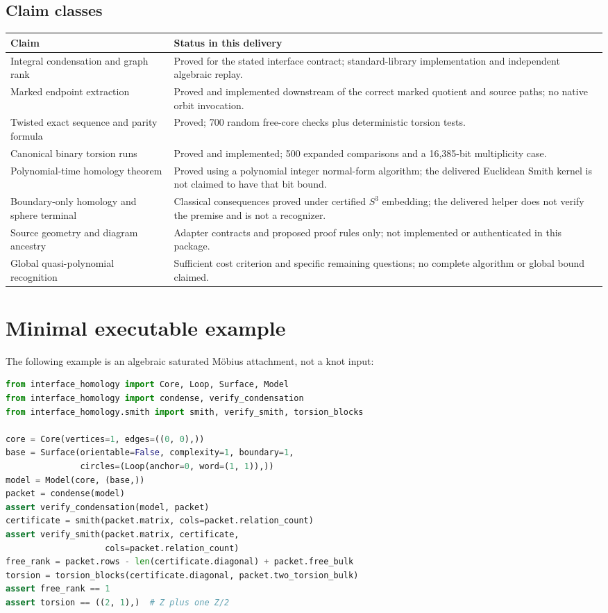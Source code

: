 \documentclass[11pt]{article}
\theoremstyle{definition}
\theoremstyle{remark}
\begin{document}
\subsection{Claim classes}
\begin{longtable}{@{}>{\raggedright\arraybackslash}p{}>{\raggedright\arraybackslash}p{}@{}}
\toprule
Claim & Status in this delivery\\
\midrule
\endhead
Integral condensation and graph rank & Proved for the stated interface
contract; standard-library implementation and independent algebraic replay.\\
Marked endpoint extraction & Proved and implemented downstream of the
correct marked quotient and source paths; no native orbit invocation.\\
Twisted exact sequence and parity formula & Proved; 700 random free-core
checks plus deterministic torsion tests.\\
Canonical binary torsion runs & Proved and implemented; 500 expanded
comparisons and a 16,385-bit multiplicity case.\\
Polynomial-time homology theorem & Proved using a polynomial integer
normal-form algorithm; the delivered Euclidean Smith kernel is not claimed
to have that bit bound.\\
Boundary-only homology and sphere terminal & Classical consequences proved
under certified $S^3$ embedding; the delivered helper does not verify the
premise and is not a recognizer.\\
Source geometry and diagram ancestry & Adapter contracts and proposed proof
rules only; not implemented or authenticated in this package.\\
Global quasi-polynomial recognition & Sufficient cost criterion and specific
remaining questions; no complete algorithm or global bound claimed.\\
\bottomrule
\end{longtable}

\section{Minimal executable example}
\label{app:example}
The following example is an algebraic saturated M\"obius attachment, not a
knot input:
\begin{lstlisting}[language=Python]
from interface_homology import Core, Loop, Surface, Model
from interface_homology import condense, verify_condensation
from interface_homology.smith import smith, verify_smith, torsion_blocks

core = Core(vertices=1, edges=((0, 0),))
base = Surface(orientable=False, complexity=1, boundary=1,
               circles=(Loop(anchor=0, word=(1, 1)),))
model = Model(core, (base,))
packet = condense(model)
assert verify_condensation(model, packet)
certificate = smith(packet.matrix, cols=packet.relation_count)
assert verify_smith(packet.matrix, certificate,
                    cols=packet.relation_count)
free_rank = packet.rows - len(certificate.diagonal) + packet.free_bulk
torsion = torsion_blocks(certificate.diagonal, packet.two_torsion_bulk)
assert free_rank == 1
assert torsion == ((2, 1),)  # Z plus one Z/2
\end{lstlisting}
\end{document}
